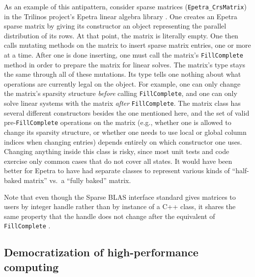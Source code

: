 As an example of this antipattern, consider sparse matrices
(\texttt{Epetra\_CrsMatrix}) in the Trilinos project's Epetra linear
algebra library \cite{heroux2005trilinos}.  One creates an Epetra
sparse matrix by giving its constructor an object representing the
parallel distribution of its rows.  At that point, the matrix is
literally empty.  One then calls mutating methods on the matrix to
insert sparse matrix entries, one or more at a time.  After one is
done inserting, one must call the matrix's \texttt{FillComplete}
method in order to prepare the matrix for linear solves.  The matrix's
type stays the same through all of these mutations.  Its type tells
one nothing about what operations are currently legal on the object.
For example, one can only change the matrix's sparsity structure
\emph{before} calling \texttt{FillComplete}, and one can only solve
linear systems with the matrix \emph{after} \texttt{FillComplete}.
The matrix class has several different constructors besides the one
mentioned here, and the set of valid pre-\texttt{FillComplete}
operations on the matrix (e.g., whether one is allowed to change its
sparsity structure, or whether one needs to use local or global column
indices when changing entries) depends entirely on which constructor
one uses.  Changing anything inside this class is risky, since most
unit tests and code exercise only common cases that do not cover all
states.  It would have been better for Epetra to have had separate
classes to represent various kinds of ``half-baked matrix'' vs.\ a
``fully baked'' matrix.

Note that even though the Sparse BLAS interface standard gives
matrices to users by integer handle rather than by instance of a C++
class, it shares the same property that the handle does not change
after the equivalent of \texttt{FillComplete}
\cite[pp.\ 129--30]{BLAS-standard}.

\subsection{Democratization of high-performance computing}
\label{SS:90s:demo}

